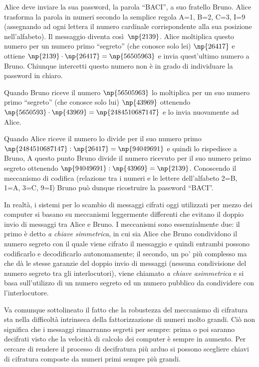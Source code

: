 Alice deve inviare la sua password, la parola ``BACI'', a suo fratello Bruno. Alice trasforma la parola in numeri secondo la semplice regola A=1, B=2, C=3, I=9 (assegnando ad ogni lettera il numero cardinale corrispondente alla sua posizione nell'alfabeto). Il messaggio diventa così~$ \np{2139} $. Alice moltiplica questo numero per un numero primo ``segreto'' (che conosce solo lei) $\np{26417}$ e ottiene $\np{2139} \cdot \np{26417}=\np{56505963}$ e invia quest'ultimo numero a Bruno. Chiunque intercetti questo numero non è in grado di individuare la password in chiaro.

Quando Bruno riceve il numero $ \np{56505963} $ lo moltiplica per un suo numero primo ``segreto'' (che conosce solo lui) $\np{43969}$ ottenendo $\np{5650593} \cdot \np{43969}=\np{2484510687147}$ e lo invia nuovamente ad Alice.

Quando Alice riceve il numero lo divide per il suo numero primo $\np{2484510687147} : \np{26417} = \np{94049691}$ e quindi lo rispedisce a Bruno,
A questo punto Bruno divide il numero ricevuto per il suo numero primo segreto ottenendo $\np{94049691} : \np{43969} = \np{2139}$. Conoscendo il meccanismo di codifica (relazione tra i numeri e le lettere dell'alfabeto  2=B, 1=A, 3=C, 9=I) Bruno può dunque ricostruire la password ``BACI''.

In realtà, i sistemi per lo scambio di messaggi cifrati oggi utilizzati per mezzo dei computer si basano su meccanismi leggermente differenti che evitano il doppio invio di messaggi tra Alice e Bruno. I meccanismi sono essenzialmente due: il primo è detto \emph{a chiave simmetrica}, in cui sia Alice che Bruno condividono il numero segreto con il quale viene cifrato il messaggio e quindi entrambi possono codificarlo e decodificarlo autonomamente; il secondo, un po' più complesso ma che dà le stesse garanzie del doppio invio di messaggi (nessuna condivisione del numero segreto tra gli interlocutori), viene chiamato \emph{a chiave asimmetrica} e si basa sull'utilizzo di un numero segreto ed un numero pubblico da condividere con l'interlocutore.

Va comunque sottolineato il fatto che la robustezza del meccanismo di cifratura sta nella difficoltà intrinseca della fattorizzazione di numeri molto grandi. Ciò non significa che i messaggi rimarranno segreti per sempre: prima o poi saranno decifrati visto che la velocità di calcolo dei computer è sempre in aumento. Per cercare di rendere il processo di decifratura più arduo si possono scegliere chiavi di cifratura composte da numeri primi sempre più grandi.


